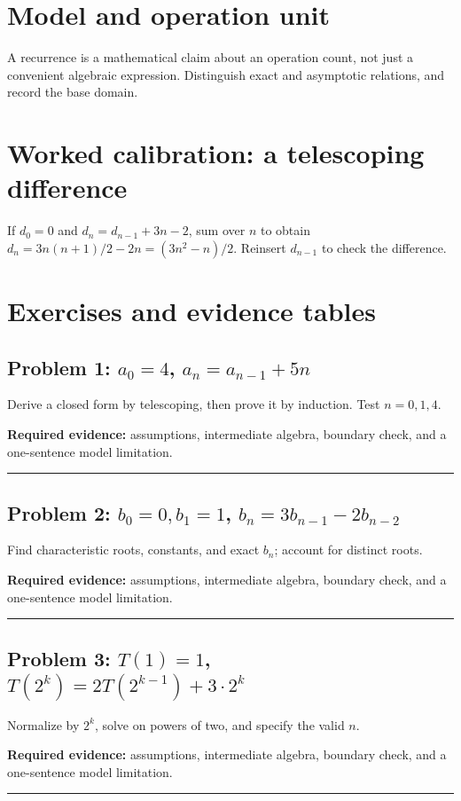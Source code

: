 \documentclass[11pt]{article}
\begin{document}
\makedoctocpage
\section{Model and operation unit}
A recurrence is a mathematical claim about an operation count, not just a convenient algebraic expression. Distinguish exact and asymptotic relations, and record the base domain.
\section{Worked calibration: a telescoping difference}
If $d_0=0$ and $d_n=d_{n-1}+3n-2$, sum over $n$ to obtain $d_n=3n(n+1)/2-2n=(3n^2-n)/2$. Reinsert $d_{n-1}$ to check the difference.

\section{Exercises and evidence tables}
\subsection{\texorpdfstring{Problem 1: $a_0=4$, $a_n=a_{n-1}+5n$}{Problem 1: First-order recurrence with increment 5n}}
Derive a closed form by telescoping, then prove it by induction. Test $n=0,1,4$.\par
\textbf{Required evidence:} assumptions, intermediate algebra, boundary check, and a one-sentence model limitation.\par
\vspace{1.2cm}\hrule\vspace{0.4cm}
\subsection{\texorpdfstring{Problem 2: $b_0=0,b_1=1$, $b_n=3b_{n-1}-2b_{n-2}$}{Problem 2: Second-order linear recurrence}}
Find characteristic roots, constants, and exact $b_n$; account for distinct roots.\par
\textbf{Required evidence:} assumptions, intermediate algebra, boundary check, and a one-sentence model limitation.\par
\vspace{1.2cm}\hrule\vspace{0.4cm}
\subsection{\texorpdfstring{Problem 3: $T(1)=1$, $T(2^k)=2T(2^{k-1})+3\cdot 2^k$}{Problem 3: Divide-and-conquer recurrence on powers of two}}
Normalize by $2^k$, solve on powers of two, and specify the valid $n$.\par
\textbf{Required evidence:} assumptions, intermediate algebra, boundary check, and a one-sentence model limitation.\par
\vspace{1.2cm}\hrule\vspace{0.4cm}
\end{document}
